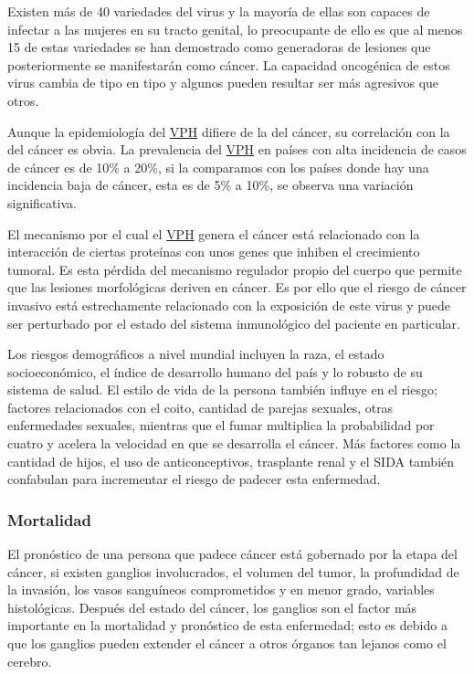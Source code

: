 
Existen más de 40 variedades del virus y la mayoría de ellas son capaces de
infectar a las mujeres en su tracto genital, lo preocupante de ello es que al
menos 15 de estas variedades se han demostrado como generadoras de  lesiones que
posteriormente se manifestarán como cáncer. La capacidad oncogénica de estos
virus cambia de tipo en tipo y algunos pueden resultar ser más agresivos que
otros. 

Aunque la epidemiología del \hyperlink{abbr}{VPH} difiere de la del cáncer, su
correlación con la del cáncer es obvia. La prevalencia del \hyperlink{abbr}{VPH}
en países con alta incidencia de casos de cáncer es de 10\% a 20\%, si la
comparamos con los países donde hay una incidencia baja de cáncer, esta es de
5\% a 10\%, se observa una variación significativa. 

El mecanismo por el cual el \hyperlink{abbr}{VPH} genera el cáncer está
relacionado con la interacción de ciertas proteínas con unos genes que inhiben
el crecimiento tumoral. Es esta pérdida del mecanismo regulador propio del
cuerpo que permite que las lesiones morfológicas deriven en cáncer. Es por ello
que el riesgo de cáncer invasivo está estrechamente relacionado con la
exposición de este virus y puede ser perturbado por el estado del sistema
inmunológico del paciente en particular. 

Los riesgos demográficos a nivel mundial incluyen la raza, el estado
socioeconómico, el índice de desarrollo humano del país y lo robusto de su
sistema de salud. El estilo de vida de la persona también influye en el riesgo;
factores relacionados con el coito, cantidad de parejas sexuales, otras
enfermedades sexuales, mientras que el fumar multiplica la probabilidad por
cuatro y acelera la velocidad en que se desarrolla el cáncer. Más factores como
la cantidad de hijos, el uso de anticonceptivos, trasplante renal y el SIDA
también confabulan para incrementar el riesgo de padecer esta enfermedad.

\subsubsection{Mortalidad}
El pronóstico de una persona que padece cáncer está gobernado por la etapa del cáncer,
si existen ganglios involucrados, el volumen del tumor, la profundidad de la invasión,
los vasos sanguíneos comprometidos y en menor grado, variables histológicas. Después del
estado del cáncer, los ganglios son el factor más importante en la mortalidad y pronóstico
de esta enfermedad; esto es debido a que los ganglios pueden extender el cáncer a otros órganos
tan lejanos como el cerebro.

